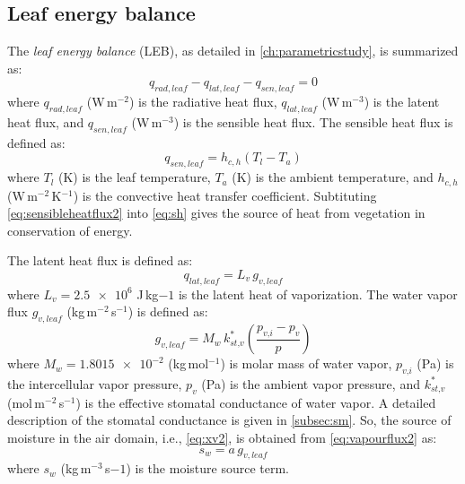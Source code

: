 \subsection*{Leaf energy balance}

The \textit{leaf energy balance} (LEB), as detailed in \cref{ch:parametricstudy}, is summarized as:
\begin{equation}
{q_{\mathit{rad},\mathit{leaf}}} - {q_{\mathit{lat},\mathit{leaf}}} - {q_{\mathit{sen},\mathit{leaf}}} = 0
\label{eq:energybalance2}
\end{equation}
where ${q_{\mathit{rad},\mathit{leaf}}}$ (W\,m$^{-2}$) is the radiative heat flux, ${q_{\mathit{lat},\mathit{leaf}}}$ (W\,m$^{-3}$) is the latent heat flux, and ${q_{\mathit{sen},\mathit{leaf}}}$ (W\,m$^{-3}$) is the sensible heat flux. The sensible heat flux is defined as:
\begin{equation}
{q_{\mathit{sen,leaf}}} = {h_{c,h}} \left( {{T_{\mathit{l}}} - T_a} \right)
\label{eq:sensibleheatflux2}
\end{equation}
where $T_l$ (K) is the leaf temperature, $T_a$ (K) is the ambient temperature, and ${h_{c,h}}$ (W\,m$^{-2}$\,K$^{-1}$) is the convective heat transfer coefficient. Subtituting \cref{eq:sensibleheatflux2} into \cref{eq:sh} gives the source of heat from vegetation in conservation of energy.

The latent heat flux is defined as:
\begin{equation}
{q_{lat,leaf}} = {L_v} \, {g_{v,leaf}}
\label{eq:latentheatflux2}
\end{equation}
where $L_v=\num{2.5e6}$ J\,kg${-1}$ is the latent heat of vaporization. The water vapor flux $g_{v,leaf}$ (kg\,m$^{-2}$\,s$^{-1}$) is defined as:
\begin{equation}
{g_{\mathit{v,leaf}}} = M_w\, k_{\textit{st,v}}^* \left( \frac{p_{\textit{v,i}} - {p_v}}{p} \right)
\label{eq:vapourflux2}
\end{equation}
where $M_w = \num{1.8015e-2}$ (kg\,mol$^{-1}$) is molar mass of water vapor, $p_{\textit{v,i}}$ (Pa) is the intercellular vapor pressure, $p_v$ (Pa) is the ambient vapor pressure, and $k_{\textit{st,v}}^*$ (mol\,m$^{-2}$\,s$^{-1}$) is the effective stomatal conductance of water vapor. A detailed description of the stomatal conductance is given in \cref{subsec:sm}. So, the source of moisture in the air domain, i.e., \cref{eq:xv2}, is obtained from \cref{eq:vapourflux2} as:
\begin{equation}
s_w = a\,{g_{\mathit{v,leaf}}}
\label{eq:sw}
\end{equation}
where $s_w$ (kg\,m$^{-3}$\,s${-1}$) is the moisture source term. 

